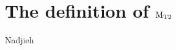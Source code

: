 \section{\texorpdfstring{The definition of $\rm {M_{T2}}$}{The definition of MT2}}
\label{sect:mt2def}

Nadjieh
